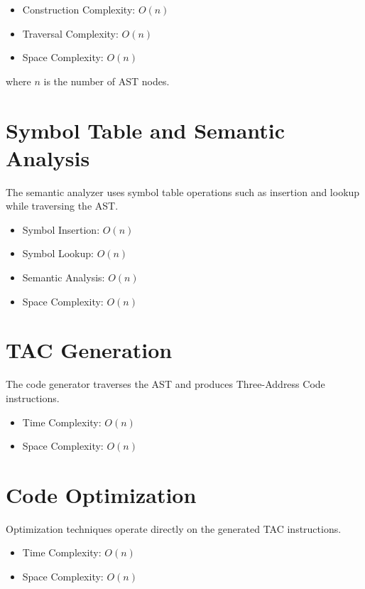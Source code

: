 \documentclass[12pt,a4paper]{report}
\begin{document}
\begin{itemize}
    \item Construction Complexity: \(O(n)\)
    \item Traversal Complexity: \(O(n)\)
    \item Space Complexity: \(O(n)\)
\end{itemize}

where \(n\) is the number of AST nodes.

\section{Symbol Table and Semantic Analysis}

The semantic analyzer uses symbol table operations such as insertion and lookup while traversing the AST.

\begin{itemize}
    \item Symbol Insertion: \(O(n)\)
    \item Symbol Lookup: \(O(n)\)
    \item Semantic Analysis: \(O(n)\)
    \item Space Complexity: \(O(n)\)
\end{itemize}

\section{TAC Generation}

The code generator traverses the AST and produces Three-Address Code instructions.

\begin{itemize}
    \item Time Complexity: \(O(n)\)
    \item Space Complexity: \(O(n)\)
\end{itemize}

\section{Code Optimization}

Optimization techniques operate directly on the generated TAC instructions.

\begin{itemize}
    \item Time Complexity: \(O(n)\)
    \item Space Complexity: \(O(n)\)
\end{itemize}
\end{document}
